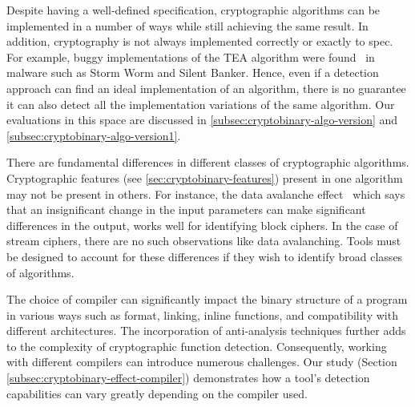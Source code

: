  Despite having a well-defined specification, cryptographic algorithms can be implemented in a number of
ways while still achieving the same result.  In addition, cryptography is not always implemented correctly or exactly to spec.
For example, buggy implementations of the TEA algorithm
were found~\cite{calvet2012aligot} in malware such as Storm Worm and Silent Banker.
Hence, even if a detection approach can find an ideal implementation of an algorithm, there is no
guarantee it can also detect all the implementation variations
of the same algorithm. 
Our evaluations in this space are discussed in \autoref{subsec:cryptobinary-algo-version} and \autoref{subsec:cryptobinary-algo-version1}.


 There are fundamental differences in different classes of cryptographic algorithms.
Cryptographic features (see \autoref{sec:cryptobinary-features}) present in one algorithm may not be present in others.
For instance, the data avalanche effect~\cite{li2012cipherxray} which says that an insignificant change in the input parameters can
make significant differences in the output, works well for identifying block ciphers. In the case of stream ciphers, there are
no such observations like data avalanching. Tools must be designed to account for these differences if they wish to identify broad classes of algorithms.


 The choice of compiler can significantly impact the binary structure of a program in various ways such as format, linking, inline functions, and compatibility with different architectures. The incorporation of anti-analysis techniques further adds to the complexity of cryptographic function detection. Consequently, working with different compilers can introduce numerous challenges. 
Our study (Section \ref{subsec:cryptobinary-effect-compiler}) demonstrates how a tool's detection capabilities can vary greatly depending on the compiler used.


